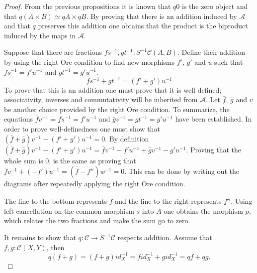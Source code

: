     \begin{proof}
        From the previous propositions it is known that $q0$ is the zero object and that $q(A\times B)\simeq qA\times qB$. By proving that there is an addition induced by $\mathcal{A}$ and that $q$ preserves this addition one obtains that the product is the biproduct induced by the maps in $\mathcal{A}$.

        Suppose that there are fractions $fs^{-1}, gt^{-1}:S^{-1}\mathcal{C}(A,B)$. Define their addition by using the right Ore condition to find new morphisms $f'$, $g'$ and $u$ such that $fs^{-1} = f'u^{-1}$ and $gt^{-1} = g'u^{-1}$.
        \begin{equation*}
            fs^{-1}+gt^{-1} = (f'+g')u^{-1}
        \end{equation*}
        To prove that this is an addition one must prove that it is well defined; associativity, inverses and commutativity will be inherited from $\mathcal{A}$.
        Let $\bar{f}$, $\bar{g}$ and $v$ be another choice provided by the right Ore condition. To summarize, the equations $\bar{f}v^{-1}=fs^{-1}=f'u^{-1}$ and $\bar{g}v^{-1}=gt^{-1}=g'u^{-1}$ have been established. In order to prove well-definedness one must show that $(\bar{f}+\bar{g})v^{-1}-(f'+g')u^{-1}=0$. By definition $(\bar{f}+\bar{g})v^{-1}-(f'+g')u^{-1}=\bar{f}v^{-1}-f'u^{-1}+\bar{g}v^{-1}-g'u^{-1}$. Proving that the whole sum is $0$, is the same as proving that $\bar{f}v^{-1}+(-f')u^{-1}=(\bar{\bar{f}}-f'')w^{-1}=0$. This can be done by writing out the diagrams after repeatedly applying the right Ore condition.
        \begin{center}
        \end{center}
        The line to the bottom represents $\bar{\bar{f}}$ and the line to the right represents $f''$. Using left cancellation on the common morphism $s$ into $A$ one obtains the morphism $p$, which relates the two fractions and make the sum go to zero.

        It remains to show that $q:\mathcal{C}\rightarrow S^{-1}\mathcal{C}$ respects addition. Assume that $f,g:\mathcal{C}(X,Y)$, then
        \begin{equation*}
            q(f+g)=(f+g)id_X^{-1}=fid_X^{-1}+gid_X^{-1}=qf+qg.
        \end{equation*}
    \end{proof}

